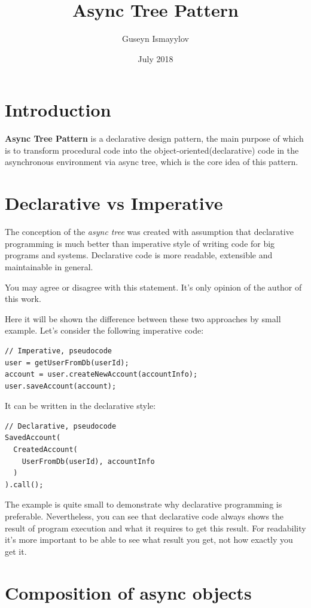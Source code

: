 \documentclass{article}
\title{Async Tree Pattern}
\author{Guseyn Ismayylov}
\date{July 2018}
\begin{document}
\maketitle

\section{Introduction}

\textbf{Async Tree Pattern} is a declarative design pattern, the main purpose of which is to transform procedural code into the object-oriented(declarative) code in the asynchronous environment via async tree, which is the core idea of this pattern.

\section{Declarative vs Imperative}

The conception of the \textit{async tree} was created with assumption that declarative programming is much better than imperative style of writing code for big programs and systems. Declarative code is more readable, extensible and maintainable in general.

You may agree or disagree with this statement. It's only opinion of the author of this work.

Here it will be shown the difference between these two approaches by small example. Let's consider the following imperative code:  

\begin{lstlisting}
// Imperative, pseudocode
user = getUserFromDb(userId);
account = user.createNewAccount(accountInfo);
user.saveAccount(account);
\end{lstlisting}

It can be written in the declarative style:

\begin{lstlisting}
// Declarative, pseudocode
SavedAccount(
  CreatedAccount(
    UserFromDb(userId), accountInfo
  )
).call();
\end{lstlisting}

The example is quite small to demonstrate why declarative programming is preferable. Nevertheless, you can see that declarative code always shows the result of program execution and what it requires to get this result. For readability it's more important to be able to see what result you get, not how exactly you get it.

\section{Composition of async objects}
\end{document}
